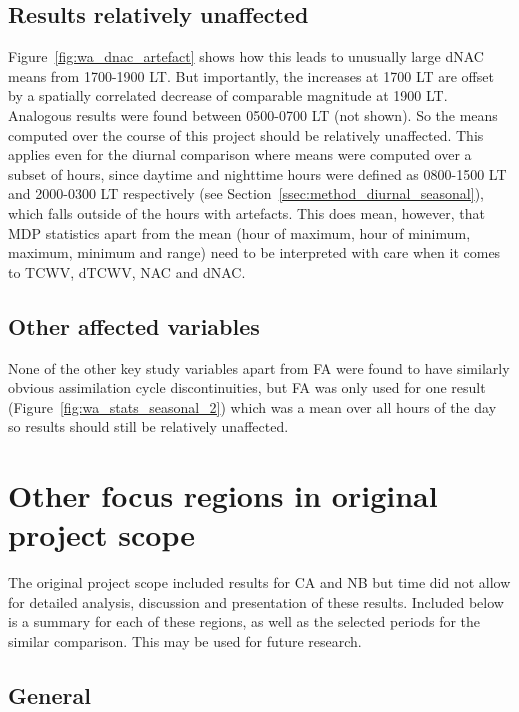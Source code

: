 \subsection{Results relatively unaffected}

Figure~\ref{fig:wa_dnac_artefact} shows how this leads to unusually large \ac{dNAC} means from 1700-1900 \ac{LT}. But importantly, the increases at 1700 \ac{LT} are offset by a spatially correlated decrease of comparable magnitude at 1900 \ac{LT}. Analogous results were found between 0500-0700 \ac{LT} (not shown). So the means computed over the course of this project should be relatively unaffected. This applies even for the diurnal comparison where means were computed over a subset of hours, since daytime and nighttime hours were defined as 0800-1500 \ac{LT} and 2000-0300 \ac{LT} respectively (see Section~\ref{ssec:method_diurnal_seasonal}), which falls outside of the hours with artefacts. This does mean, however, that \ac{MDP} statistics apart from the mean (hour of maximum, hour of minimum, maximum, minimum and range) need to be interpreted with care when it comes to \ac{TCWV}, \ac{dTCWV}, \ac{NAC} and \ac{dNAC}. 

\subsection{Other affected variables}

None of the other key study variables apart from \ac{FA} were found to have similarly obvious assimilation cycle discontinuities, but \ac{FA} was only used for one result (Figure~\ref{fig:wa_stats_seasonal_2}) which was a mean over all hours of the day so results should still be relatively unaffected.

\section{Other focus regions in original project scope}
\label{sec:other_regions}

The original project scope included results for \ac{CA} and \ac{NB} but time did not allow for detailed analysis, discussion and presentation of these results. Included below is a summary for each of these regions, as well as the selected periods for the similar comparison. This may be used for future research.

\subsection{General}

